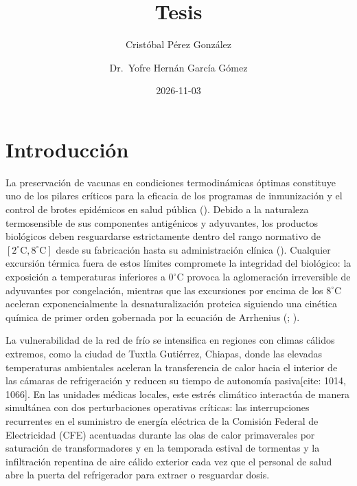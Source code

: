 \documentclass[
  spanish,
  letterpaper,
  DIV=11,
  numbers=noendperiod]{scrreprt}
\title{Tesis}
\author{Cristóbal Pérez González \and Dr.~Yofre Hernán García Gómez}
\date{2026-11-03}
\renewcommand*\contentsname{Tabla de contenidos}
\newcommand\contentsname{Tabla de contenidos}
\theoremstyle{plain}
\theoremstyle{plain}
\theoremstyle{plain}
\theoremstyle{definition}
\theoremstyle{remark}
\begin{document}
\maketitle

\renewcommand*\contentsname{Tabla de contenidos}
{
\hypersetup{linkcolor=}
\setcounter{tocdepth}{2}
\tableofcontents
}


\chapter{Introducción}\label{introducciuxf3n}

La preservación de vacunas en condiciones termodinámicas óptimas
constituye uno de los pilares críticos para la eficacia de los programas
de inmunización y el control de brotes epidémicos en salud pública
(). Debido a la
naturaleza termosensible de sus componentes antigénicos y adyuvantes,
los productos biológicos deben resguardarse estrictamente dentro del
rango normativo de \([2^\circ\text{C}, 8^\circ\text{C}]\) desde su
fabricación hasta su administración clínica
().
Cualquier excursión térmica fuera de estos límites compromete la
integridad del biológico: la exposición a temperaturas inferiores a
\(0^\circ\text{C}\) provoca la aglomeración irreversible de adyuvantes
por congelación, mientras que las excursiones por encima de los
\(8^\circ\text{C}\) aceleran exponencialmente la desnaturalización
proteica siguiendo una cinética química de primer orden gobernada por la
ecuación de Arrhenius (; ).

La vulnerabilidad de la red de frío se intensifica en regiones con
climas cálidos extremos, como la ciudad de Tuxtla Gutiérrez, Chiapas,
donde las elevadas temperaturas ambientales aceleran la transferencia de
calor hacia el interior de las cámaras de refrigeración y reducen su
tiempo de autonomía pasiva{[}cite: 1014, 1066{]}. En las unidades
médicas locales, este estrés climático interactúa de manera simultánea
con dos perturbaciones operativas críticas: las interrupciones
recurrentes en el suministro de energía eléctrica de la Comisión Federal
de Electricidad (CFE) acentuadas durante las olas de calor primaverales
por saturación de transformadores y en la temporada estival de tormentas
y la infiltración repentina de aire cálido exterior cada vez que el
personal de salud abre la puerta del refrigerador para extraer o
resguardar dosis.
\end{document}
